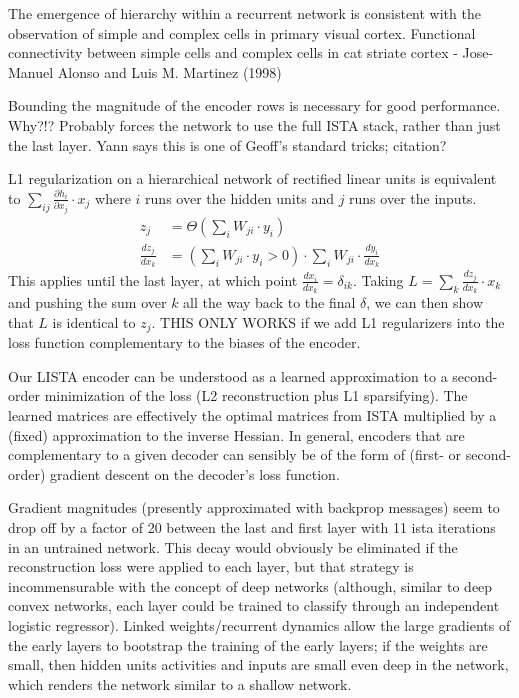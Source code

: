 The emergence of hierarchy within a recurrent network is consistent with the observation of simple and complex cells in primary visual cortex.  
Functional connectivity between simple cells and complex cells in cat striate cortex - Jose-Manuel Alonso and Luis M. Martinez (1998)

Bounding the magnitude of the encoder rows is necessary for good performance.  Why?!?  Probably forces the network to use the full ISTA stack, rather than just the last layer.  Yann says this is one of Geoff's standard tricks; citation?

L1 regularization on a hierarchical network of rectified linear units is equivalent to $\sum_{ij} \frac{\partial h_i}{\partial x_j} \cdot x_j$ where $i$ runs over the hidden units and $j$ runs over the inputs.  
\begin{align*}
z_j &= \Theta\left(\sum_i W_{ji} \cdot y_i \right) \\
\frac{d z_j}{d x_k} &= \left( \sum_i W_{ji} \cdot y_i > 0 \right) \cdot \sum_i W_{ji} \cdot \frac{d y_i}{d x_k} 
\end{align*}
This applies until the last layer, at which point $\frac{d x_i}{d x_k} = \delta_{ik}$.  Taking $L = \sum_k \frac{d z_j}{d x_k} \cdot x_k$ and pushing the sum over $k$ all the way back to the final $\delta$, we can then show that $L$ is identical to $z_j$.  THIS ONLY WORKS if we add L1 regularizers into the loss function complementary to the biases of the encoder.

Our LISTA encoder can be understood as a learned approximation to a second-order minimization of the loss (L2 reconstruction plus L1 sparsifying).  The learned matrices are effectively the optimal matrices from ISTA multiplied by a (fixed) approximation to the inverse Hessian.  In general, encoders that are complementary to a given decoder can sensibly be of the form of (first- or second-order) gradient descent on the decoder's loss function. 

Gradient magnitudes (presently approximated with backprop messages) seem to drop off by a factor of 20 between the last and first layer with 11 ista iterations in an untrained network.  This decay would obviously be eliminated if the reconstruction loss were applied to each layer, but that strategy is incommensurable with the concept of deep networks (although, similar to deep convex networks, each layer could be trained to classify through an independent logistic regressor).  Linked weights/recurrent dynamics allow the large gradients of the early layers to bootstrap the training of the early layers; if the weights are small, then hidden units activities and inputs are small even deep in the network, which renders the network similar to a shallow network.





